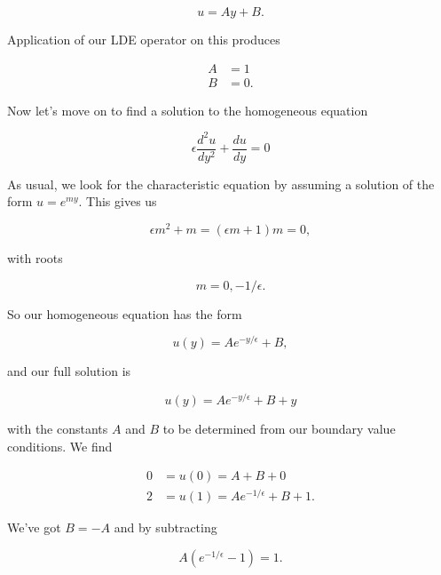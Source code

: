 \begin{equation}\label{eqn:continuumL20:510}
u = A y + B.
\end{equation}

Application of our LDE operator on this produces

\begin{align*}
A &= 1 \\
B &= 0.
\end{align*}

Now let's move on to find a solution to the homogeneous equation

\begin{equation}\label{eqn:continuumL20:30b}
\epsilon \frac{d^2u}{dy^2} + \frac{du}{dy} = 0
\end{equation}

As usual, we look for the characteristic equation by assuming a solution of the form $u = e^{m y}$.  This gives us

\begin{equation}\label{eqn:continuumL20:530}
\epsilon m^2 + m = (\epsilon m + 1) m = 0,
\end{equation}

with roots

\begin{equation}\label{eqn:continuumL20:550}
m = 0, -1/\epsilon.
\end{equation}

So our homogeneous equation has the form

\begin{equation}\label{eqn:continuumL20:570}
u(y) = A e^{-y/\epsilon} + B,
\end{equation}

and our full solution is

\begin{equation}\label{eqn:continuumL20:590}
u(y) = A e^{-y/\epsilon} + B + y
\end{equation}

with the constants $A$ and $B$ to be determined from our boundary value conditions.  We find

\begin{align*}
0 &= u(0) = A + B + 0 \\
2 &= u(1) = A e^{-1/\epsilon} + B + 1.
\end{align*}

We've got $B = -A$ and by subtracting

\begin{equation}\label{eqn:continuumL20:610}
A ( e^{-1/\epsilon} -1 ) = 1.
\end{equation}

